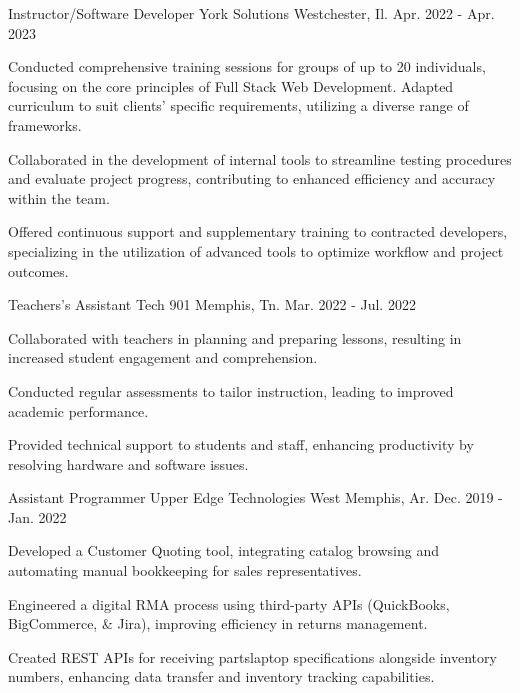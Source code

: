 

\begin{cventries}
	\cventry
	{Instructor/Software Developer} %
	{York Solutions} %
	{Westchester, Il.}
	{Apr. 2022 - Apr. 2023}
	{
		\begin{cvitems}
		\item {Conducted comprehensive training sessions for groups of up to 20 individuals, focusing on the core principles of Full Stack Web Development. Adapted curriculum to suit clients' specific requirements, utilizing a diverse range of frameworks.}
		\item {Collaborated in the development of internal tools to streamline testing procedures and evaluate project progress, contributing to enhanced efficiency and accuracy within the team.}
		\item {Offered continuous support and supplementary training to contracted developers, specializing in the utilization of advanced tools to optimize workflow and project outcomes.}
		\end{cvitems}
	}
	

	\cventry
	{Teachers's Assistant}
	{Tech 901}
	{Memphis, Tn.}
	{Mar. 2022 - Jul. 2022}
	{
		\begin{cvitems} %
		\item {Collaborated with teachers in planning and preparing lessons, resulting in increased student engagement and comprehension.}
		\item {Conducted regular assessments to tailor instruction, leading to improved academic performance.}
		\item {Provided technical support to students and staff, enhancing productivity by resolving hardware and software issues.}
		\end{cvitems}
	}

	\cventry
	{Assistant Programmer} %
	{Upper Edge Technologies } %
	{West Memphis, Ar.} %
	{Dec. 2019 - Jan. 2022} %
	{
		\begin{cvitems} %
		\item {Developed a Customer Quoting tool, integrating catalog browsing and automating manual bookkeeping for sales representatives.} 
		\item {Engineered a digital RMA process using third-party APIs (QuickBooks, BigCommerce, \& Jira), improving efficiency in returns management.} 
		\item {Created REST APIs for receiving parts\/laptop specifications alongside inventory numbers, enhancing data transfer and inventory tracking capabilities.}
		\end{cvitems}
	}


\end{cventries}
